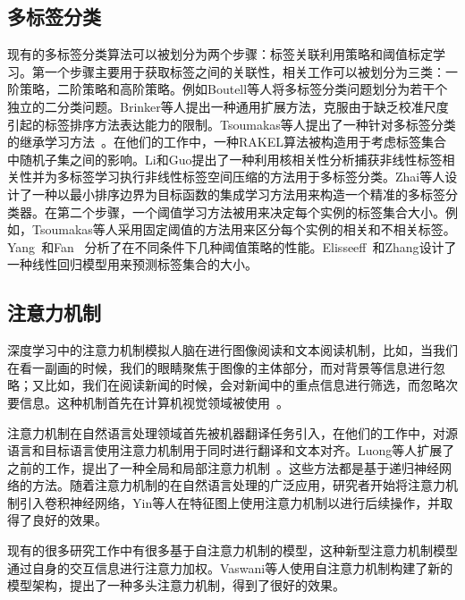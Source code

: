 \subsection{多标签分类}
现有的多标签分类算法可以被划分为两个步骤：标签关联利用策略和阈值标定学习。第一个步骤主要用于获取标签之间的关联性，相关工作可以被划分为三类\cite{Zhang2014A}：一阶策略，二阶策略和高阶策略。例如Boutell等人将多标签分类问题划分为若干个独立的二分类问题\cite{Boutell2004Learning}。Brinker等人提出一种通用扩展方法，克服由于缺乏校准尺度引起的标签排序方法表达能力的限制\cite{Brinker2008Multilabel}。Tsoumakas等人提出了一种针对多标签分类的继承学习方法~\cite{Tsoumakas2007Random}。在他们的工作中，一种RAKEL算法被构造用于考虑标签集合中随机子集之间的影响。Li和Guo提出了一种利用核相关性分析捕获非线性标签相关性并为多标签学习执行非线性标签空间压缩的方法用于多标签分类\cite{Li2015Multi}。Zhai等人设计了一种以最小排序边界为目标函数的集成学习方法用来构造一个精准的多标签分类器\cite{Zhai2015A}。在第二个步骤，一个阈值学习方法被用来决定每个实例的标签集合大小。例如，Tsoumakas等人采用固定阈值的方法用来区分每个实例的相关和不相关标签\cite{Tsoumakas2007Random}。Yang~\cite{Yang2001}和Fan~\cite{fan2007study} 分析了在不同条件下几种阈值策略的性能。Elisseeff~\cite{Elisseeff2001A}和Zhang\cite{Zhang2014A}设计了一种线性回归模型用来预测标签集合的大小。

\subsection{注意力机制}
深度学习中的注意力机制模拟人脑在进行图像阅读和文本阅读机制，比如，当我们在看一副画的时候，我们的眼睛聚焦于图像的主体部分，而对背景等信息进行忽略；又比如，我们在阅读新闻的时候，会对新闻中的重点信息进行筛选，而忽略次要信息。这种机制首先在计算机视觉领域被使用~\cite{MnihHGK14}。

注意力机制在自然语言处理领域首先被机器翻译任务引入\cite{bahdanau2014neural}，在他们的工作中，对源语言和目标语言使用注意力机制用于同时进行翻译和文本对齐。Luong等人扩展了之前的工作，提出了一种全局和局部注意力机制~\cite{LuongPM15}。这些方法都是基于递归神经网络的方法。随着注意力机制的在自然语言处理的广泛应用，研究者开始将注意力机制引入卷积神经网络，Yin等人在特征图上使用注意力机制以进行后续操作，并取得了良好的效果\cite{YinSXZ16}。

现有的很多研究工作中有很多基于自注意力机制的模型\cite{LinFSYXZB17, Jacob181004805}，这种新型注意力机制模型通过自身的交互信息进行注意力加权。Vaswani等人使用自注意力机制构建了新的模型架构，提出了一种多头注意力机制\cite{VaswaniSPUJGKP17}，得到了很好的效果。

